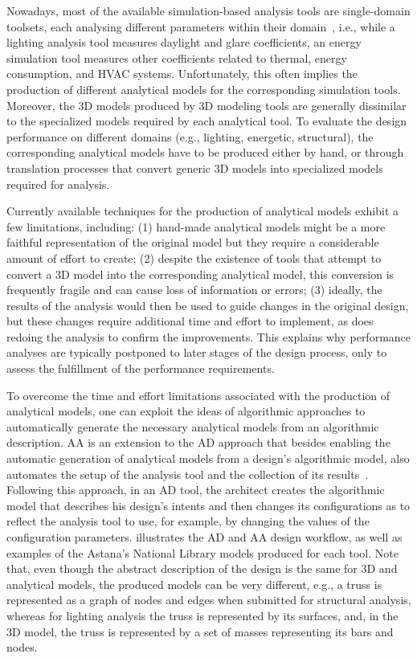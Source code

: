 	Nowadays, most of the available simulation-based analysis tools are single-domain toolsets, each analysing different parameters within their domain~\cite{Malkawi2005}, i.e., while a lighting analysis tool measures daylight and glare coefficients, an energy simulation tool measures other coefficients related to thermal, energy consumption, and \ac{HVAC} systems. Unfortunately, this often implies the production of different analytical models for the corresponding simulation tools. Moreover, the 3D models produced by 3D modeling tools are generally dissimilar to the specialized models required by each analytical tool. To evaluate the design performance on different domains (e.g., lighting, energetic, structural), the corresponding analytical models have to be produced either by hand, or through translation processes that convert generic 3D models into specialized models required for analysis.

	Currently available techniques for the production of analytical models exhibit a few limitations, including: (1) hand-made analytical models might be a more faithful representation of the original model but they require a considerable amount of effort to create; (2) despite the existence of tools that attempt to convert a 3D model into the corresponding analytical model, this conversion is frequently fragile and can cause loss of information or errors; (3) ideally, the results of the analysis would then be used to guide changes in the original design, but these changes require additional time and effort to implement, as does redoing the analysis to confirm the improvements. This explains why performance analyses are typically postponed to later stages of the design process, only to assess the fulfillment of the performance requirements.

	To overcome the time and effort limitations associated with the production of analytical models, one can exploit the ideas of algorithmic approaches to automatically generate the necessary analytical models from an algorithmic description. \ac{AA} is an extension to the \ac{AD} approach that besides enabling the automatic generation of analytical models from a design's algorithmic model, also automates the setup of the analysis tool and the collection of its results~\cite{Aguiar2017}. Following this approach, in an \ac{AD} tool, the architect creates the algorithmic model that describes his design's intents and then changes its configurations as to reflect the analysis tool to use, for example, by changing the values of the configuration parameters.  illustrates the \ac{AD} and \ac{AA} design workflow, as well as examples of the Astana's National Library models produced for each tool. Note that, even though the abstract description of the design is the same for 3D and analytical models, the produced models can be very different, e.g., a truss is represented as a graph of nodes and edges when submitted for structural analysis, whereas for lighting analysis the truss is represented by its surfaces, and, in the 3D model, the truss is represented by a set of masses representing its bars and nodes.

